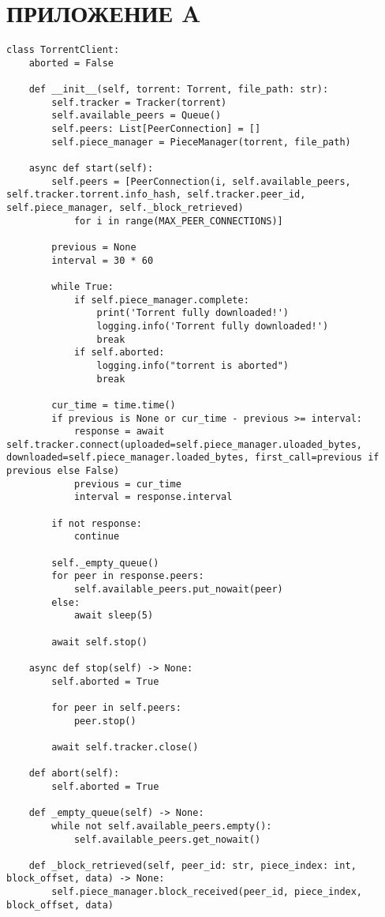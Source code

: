 \section*{ПРИЛОЖЕНИЕ A}

\begin{lstlisting}[caption = {Класс TorrentClient}]
class TorrentClient:
	aborted = False
	
	def __init__(self, torrent: Torrent, file_path: str):
		self.tracker = Tracker(torrent)
		self.available_peers = Queue()
		self.peers: List[PeerConnection] = []
		self.piece_manager = PieceManager(torrent, file_path)
	
	async def start(self):
		self.peers = [PeerConnection(i, self.available_peers, self.tracker.torrent.info_hash, self.tracker.peer_id, self.piece_manager, self._block_retrieved)
			for i in range(MAX_PEER_CONNECTIONS)]
	
		previous = None
		interval = 30 * 60
	
		while True:
			if self.piece_manager.complete:
				print('Torrent fully downloaded!')
				logging.info('Torrent fully downloaded!')
				break
			if self.aborted:
				logging.info("torrent is aborted")
				break
	
		cur_time = time.time()
		if previous is None or cur_time - previous >= interval:
			response = await self.tracker.connect(uploaded=self.piece_manager.uloaded_bytes, downloaded=self.piece_manager.loaded_bytes, first_call=previous if previous else False)
			previous = cur_time
			interval = response.interval
	
		if not response:
			continue
	
		self._empty_queue()
		for peer in response.peers:
			self.available_peers.put_nowait(peer)
		else:
			await sleep(5)
		
		await self.stop()
		
	async def stop(self) -> None:
		self.aborted = True
		
		for peer in self.peers:
			peer.stop()
		
		await self.tracker.close()
	
	def abort(self):
		self.aborted = True
	
	def _empty_queue(self) -> None:
		while not self.available_peers.empty():
			self.available_peers.get_nowait()
	
	def _block_retrieved(self, peer_id: str, piece_index: int, block_offset, data) -> None:
		self.piece_manager.block_received(peer_id, piece_index, block_offset, data)
	

\end{lstlisting}
